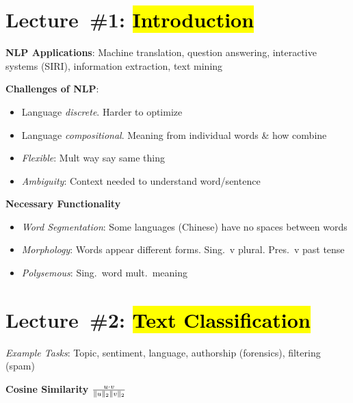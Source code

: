 \documentclass[9pt]{extarticle}
\renewcommand{\green}[1]{{\color{ForestGreen} #1}}
\newcommand{\greenbf}[1]{\textbf{\green{#1}}}
\begin{document}
\setlength{\abovedisplayskip}{0pt}
\setlength{\belowdisplayskip}{0pt}
\setlength{\abovedisplayshortskip}{0pt}
\setlength{\belowdisplayshortskip}{0pt}

\begin{multicols}{3}
  \section*{Lecture~\#1: \hl{Introduction}}

  \textbf{NLP Applications}: Machine translation, question answering, interactive systems (SIRI), information extraction, text mining

  \textbf{Challenges of NLP}:
  \begin{itemize}
    \item Language \textit{discrete}. Harder to optimize
    \item Language \textit{compositional}. Meaning from individual words \& how combine
    \item \textit{Flexible}: Mult way say same thing
    \item \textit{Ambiguity}: Context needed to understand word/sentence
  \end{itemize}

  \textbf{Necessary Functionality}
  \begin{itemize}
    \item \textit{Word Segmentation}: Some languages (Chinese) have no spaces between words
    \item \textit{Morphology}: Words appear different forms. Sing.\ v plural. Pres.\ v past tense
    \item \textit{Polysemous}: Sing.\ word mult.\ meaning
  \end{itemize}

  \section*{Lecture~\#2: \hl{Text Classification}}
  \textit{Example Tasks}: Topic, sentiment, language, authorship (forensics), filtering (spam)

  \greenbf{Cosine Similarity} $\frac{u \cdot v}{\lVert u\rVert_{2} \lVert v\rVert_{2}}$

  \subsection*{}


\end{multicols}
\end{document}
